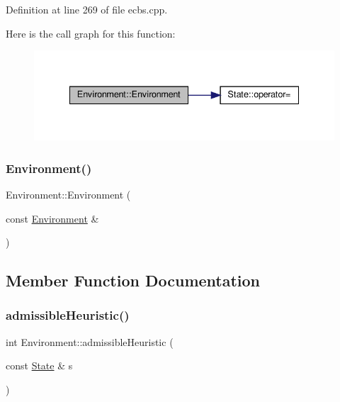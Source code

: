 Definition at line 269 of file ecbs.\+cpp.

Here is the call graph for this function\+:
\nopagebreak
\begin{figure}[H]
\begin{center}
\leavevmode
\includegraphics[width=335pt]{class_environment_a12b8baed8e6090b3eb528a27b1fecd0a_cgraph}
\end{center}
\end{figure}
\mbox{\label{class_environment_abdb9fe9212fd5d47b5664df3e67c975f}} 
\subsubsection{\texorpdfstring{Environment()}{Environment()}\hspace{0.1cm}{\footnotesize\ttfamily [6/6]}}
{\footnotesize\ttfamily Environment\+::\+Environment (\begin{DoxyParamCaption}\item[{const \hyperlink{class_environment}{Environment} \&}]{ }\end{DoxyParamCaption})\hspace{0.3cm}{\ttfamily [delete]}}



\subsection{Member Function Documentation}
\mbox{\label{class_environment_a171e702c373005a9d6e77b79daa365d9}} 
\subsubsection{\texorpdfstring{admissible\+Heuristic()}{admissibleHeuristic()}\hspace{0.1cm}{\footnotesize\ttfamily [1/4]}}
{\footnotesize\ttfamily int Environment\+::admissible\+Heuristic (\begin{DoxyParamCaption}\item[{const \hyperlink{struct_state}{State} \&}]{s }\end{DoxyParamCaption})\hspace{0.3cm}{\ttfamily [inline]}}



